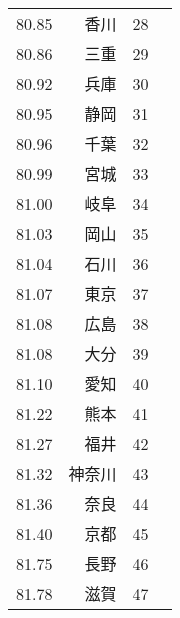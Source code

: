 \begin{table}[H]
\begin{tabular}{rrlr}
   80.85 & 香川 &  28 \\
   80.86 & 三重 &  29 \\
   80.92 & 兵庫 &  30 \\
   80.95 & 静岡 &  31 \\
   80.96 & 千葉 &  32 \\
   80.99 & 宮城 &  33 \\
   81.00 & 岐阜 &  34 \\
   81.03 & 岡山 &  35 \\
   81.04 & 石川 &  36 \\
   81.07 & 東京 &  37 \\
   81.08 & 広島 &  38 \\
   81.08 & 大分 &  39 \\
   81.10 & 愛知 &  40 \\
   81.22 & 熊本 &  41 \\
   81.27 & 福井 &  42 \\
   81.32 & 神奈川 &  43 \\
   81.36 & 奈良 &  44 \\
   81.40 & 京都 &  45 \\
   81.75 & 長野 &  46 \\
   81.78 & 滋賀 &  47 \\
     \hline
    \end{tabular}
  \end{table}









